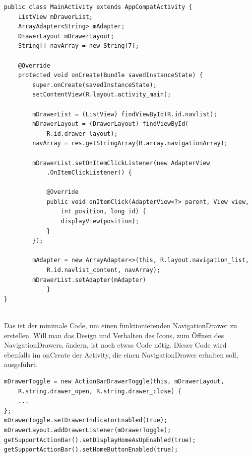 \documentclass[FIPLY_base.tex]{subfiles}
\begin{document}
\newpage
\begin{lstlisting}
public class MainActivity extends AppCompatActivity {
	ListView mDrawerList;
	ArrayAdapter<String> mAdapter;
	DrawerLayout mDrawerLayout;
	String[] navArray = new String[7];
	
	@Override
	protected void onCreate(Bundle savedInstanceState) {
		super.onCreate(savedInstanceState);
		setContentView(R.layout.activity_main);
		
		mDrawerList = (ListView) findViewById(R.id.navlist);
		mDrawerLayout = (DrawerLayout) findViewById(
			R.id.drawer_layout);
		navArray = res.getStringArray(R.array.navigationArray);

		mDrawerList.setOnItemClickListener(new AdapterView
			.OnItemClickListener() {
			
			@Override
			public void onItemClick(AdapterView<?> parent, View view, 
				int position, long id) {		
				displayView(position);
			}
		});
	
		mAdapter = new ArrayAdapter<>(this, R.layout.navigation_list, 
			R.id.navlist_content, navArray);
		mDrawerList.setAdapter(mAdapter)
			}
}
\end{lstlisting}
\ \\
Das ist der minimale Code, um einen funktionierenden NavigationDrawer zu erstellen.
Will man das Design und Verhalten des Icons, zum Öffnen des NavigationDrawers, ändern, ist noch etwas Code nötig.
Dieser Code wird ebenfalls im onCreate der Activity, die einen NavigationDrawer erhalten soll, ausgeführt.
\ \\
\begin{lstlisting}
mDrawerToggle = new ActionBarDrawerToggle(this, mDrawerLayout,
	R.string.drawer_open, R.string.drawer_close) {
	...
};
mDrawerToggle.setDrawerIndicatorEnabled(true);
mDrawerLayout.addDrawerListener(mDrawerToggle);
getSupportActionBar().setDisplayHomeAsUpEnabled(true);
getSupportActionBar().setHomeButtonEnabled(true);
\end{lstlisting}
\end{document}
